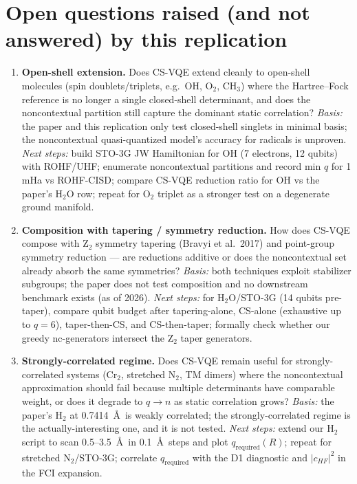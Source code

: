 \section{Open questions raised (and not answered) by this replication}

\begin{enumerate}

\item \textbf{Open-shell extension.} Does CS-VQE extend cleanly to
open-shell molecules (spin doublets/triplets, e.g.\ OH, O$_2$, CH$_3$)
where the Hartree--Fock reference is no longer a single closed-shell
determinant, and does the noncontextual partition still capture the
dominant static correlation? \emph{Basis:} the paper and this
replication only test closed-shell singlets in minimal basis; the
noncontextual quasi-quantized model's accuracy for radicals is
unproven. \emph{Next steps:} build STO-3G JW Hamiltonian for OH (7
electrons, 12 qubits) with ROHF/UHF; enumerate noncontextual
partitions and record min $q$ for 1 mHa vs ROHF-CISD; compare CS-VQE
reduction ratio for OH vs the paper's H$_2$O row; repeat for O$_2$
triplet as a stronger test on a degenerate ground manifold.

\item \textbf{Composition with tapering / symmetry reduction.} How
does CS-VQE compose with Z$_2$ symmetry tapering (Bravyi et al.\ 2017)
and point-group symmetry reduction --- are reductions additive or does
the noncontextual set already absorb the same symmetries?
\emph{Basis:} both techniques exploit stabilizer subgroups; the paper
does not test composition and no downstream benchmark exists (as of
2026). \emph{Next steps:} for H$_2$O/STO-3G (14 qubits pre-taper),
compare qubit budget after tapering-alone, CS-alone (exhaustive up to
$q\!=\!6$), taper-then-CS, and CS-then-taper; formally check whether
our greedy nc-generators intersect the Z$_2$ taper generators.

\item \textbf{Strongly-correlated regime.} Does CS-VQE remain useful
for strongly-correlated systems (Cr$_2$, stretched N$_2$, TM dimers)
where the noncontextual approximation should fail because multiple
determinants have comparable weight, or does it degrade to $q\!\to\!n$
as static correlation grows? \emph{Basis:} the paper's H$_2$ at
0.7414~\AA\ is weakly correlated; the strongly-correlated regime is
the actually-interesting one, and it is not tested. \emph{Next steps:}
extend our H$_2$ script to scan 0.5--3.5~\AA\ in 0.1~\AA\ steps and
plot $q_{\text{required}}(R)$; repeat for stretched N$_2$/STO-3G;
correlate $q_{\text{required}}$ with the D1 diagnostic and
$|c_{HF}|^2$ in the FCI expansion.


\end{enumerate}
